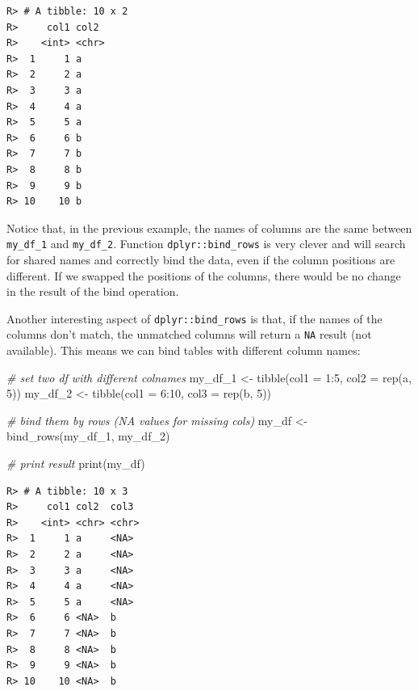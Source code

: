 \documentclass[
  12pt,
]{book}
\newenvironment{Shaded}{\begin{snugshade}}{\end{snugshade}}
\newcommand{\AttributeTok}[1]{\textcolor[rgb]{0.61,0.61,0.61}{#1}}
\newcommand{\CommentTok}[1]{\textcolor[rgb]{0.37,0.37,0.37}{\textit{#1}}}
\newcommand{\DecValTok}[1]{\textcolor[rgb]{0.06,0.06,0.06}{#1}}
\newcommand{\FunctionTok}[1]{\textcolor[rgb]{0,0,0}{#1}}
\newcommand{\NormalTok}[1]{#1}
\newcommand{\OtherTok}[1]{\textcolor[rgb]{0.37,0.37,0.37}{#1}}
\newcommand{\SpecialCharTok}[1]{\textcolor[rgb]{0,0,0}{#1}}
\newcommand{\StringTok}[1]{\textcolor[rgb]{0.5,0.5,0.5}{#1}}
\begin{document}
\begin{verbatim}
R> # A tibble: 10 x 2
R>     col1 col2 
R>    <int> <chr>
R>  1     1 a    
R>  2     2 a    
R>  3     3 a    
R>  4     4 a    
R>  5     5 a    
R>  6     6 b    
R>  7     7 b    
R>  8     8 b    
R>  9     9 b    
R> 10    10 b
\end{verbatim}

Notice that, in the previous example, the names of columns are the same between \texttt{my\_df\_1} and \texttt{my\_df\_2}. Function \texttt{dplyr::bind\_rows} is very clever and will search for shared names and correctly bind the data, even if the column positions are different. If we swapped the positions of the columns, there would be no change in the result of the bind operation.

Another interesting aspect of \texttt{dplyr::bind\_rows} is that, if the names of the columns don't match, the unmatched columns will return a \texttt{NA} result (not available). This means we can bind tables with different column names:

\begin{Shaded}
\begin{Highlighting}[]
\CommentTok{\# set two df with different colnames}
\NormalTok{my\_df\_1 }\OtherTok{\textless{}{-}} \FunctionTok{tibble}\NormalTok{(}\AttributeTok{col1 =} \DecValTok{1}\SpecialCharTok{:}\DecValTok{5}\NormalTok{, }
                  \AttributeTok{col2 =} \FunctionTok{rep}\NormalTok{(}\StringTok{\textquotesingle{}a\textquotesingle{}}\NormalTok{, }\DecValTok{5}\NormalTok{))}
\NormalTok{my\_df\_2 }\OtherTok{\textless{}{-}} \FunctionTok{tibble}\NormalTok{(}\AttributeTok{col1 =} \DecValTok{6}\SpecialCharTok{:}\DecValTok{10}\NormalTok{, }
                  \AttributeTok{col3 =} \FunctionTok{rep}\NormalTok{(}\StringTok{\textquotesingle{}b\textquotesingle{}}\NormalTok{, }\DecValTok{5}\NormalTok{))}

\CommentTok{\# bind them by rows (NA values for missing cols)}
\NormalTok{my\_df }\OtherTok{\textless{}{-}} \FunctionTok{bind\_rows}\NormalTok{(my\_df\_1, }
\NormalTok{                   my\_df\_2)}

\CommentTok{\# print result}
\FunctionTok{print}\NormalTok{(my\_df)}
\end{Highlighting}
\end{Shaded}

\begin{verbatim}
R> # A tibble: 10 x 3
R>     col1 col2  col3 
R>    <int> <chr> <chr>
R>  1     1 a     <NA> 
R>  2     2 a     <NA> 
R>  3     3 a     <NA> 
R>  4     4 a     <NA> 
R>  5     5 a     <NA> 
R>  6     6 <NA>  b    
R>  7     7 <NA>  b    
R>  8     8 <NA>  b    
R>  9     9 <NA>  b    
R> 10    10 <NA>  b
\end{verbatim}
\end{document}
